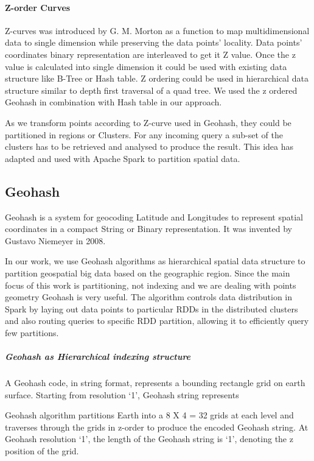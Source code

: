 \documentclass[article,type=msc,colorback,10pt,accentcolor=tud1d]{tudthesis}
\begin{document}
		  \paragraph{Z-order Curves}
		  Z-curves was introduced by G. M. Morton as a function to map multidimensional data to single dimension while preserving the data points’ locality. Data points' coordinates binary representation are interleaved to get it Z value. Once the z value is calculated into single dimension it could be used with existing data structure like B-Tree or Hash table. Z ordering could be used in hierarchical data structure similar to depth first traversal of a quad tree\cite{wiki: Z-curves}. We used the z ordered Geohash in combination with Hash table in our approach. 
		  
		  As we transform points according to Z-curve used in Geohash, they could be partitioned in regions or Clusters. For any incoming query a sub-set of the clusters has to be retrieved and analysed to produce the result. This idea has adapted and used with Apache Spark to partition spatial data.
		  
		  
		  
		   \subsection{Geohash}
		   
		   Geohash is a system for geocoding Latitude and Longitudes to represent spatial coordinates in a compact String or Binary representation. It was invented by Gustavo Niemeyer in 2008. 		   \cite{wiki:geohash} \cite{Lee:2014:ESQ:2666310.2666481, 6691586} \cite{Balkic2012}
		   
		   In our work, we use  Geohash algorithms as hierarchical spatial data structure to partition geospatial big data based on the geographic region. Since the main focus of this work is partitioning, not indexing and we are dealing with points geometry Geohash is very useful. The algorithm controls data distribution in Spark by laying out data points to particular RDDs in the distributed clusters and also routing queries to specific RDD partition, allowing it to efficiently query few partitions.
		   
		   \subparagraph{Geohash as Hierarchical indexing structure}
		   
		   A Geohash code, in string format, represents a bounding rectangle grid on earth surface. Starting from resolution ‘1’, Geohash string represents 
		   
		   Geohash algorithm partitions Earth into a 8 X 4 = 32 grids at each level and traverses through the grids in z-order \cite{wiki: Z-curves} to produce the encoded Geohash string. At Geohash resolution ‘1’, the length of the Geohash string is ‘1’, denoting the z position of the grid.
		   
\end{document}
